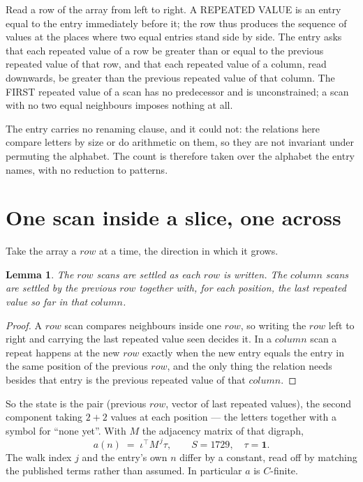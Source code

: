\documentclass[11pt,a4paper]{article}
\theoremstyle{plain}
\newtheorem{lemma}[theorem]{Lemma}
\theoremstyle{definition}
\begin{document}
Read a row of the array from left to right. A REPEATED VALUE is an entry equal to the entry
immediately before it; the row thus produces the sequence of values at the places where two
equal entries stand side by side. The entry asks that each repeated value of a row be
greater than or equal to the previous repeated value of that row, and that each repeated value of a column,
read downwards, be greater than the previous repeated value of that column. The FIRST repeated
value of a scan has no predecessor and is unconstrained; a scan with no two equal neighbours
imposes nothing at all.

The entry carries no renaming clause, and it could not: the relations here compare letters by
size or do arithmetic on them, so they are not invariant under permuting the alphabet. The
count is therefore taken over the alphabet the entry names, with no reduction to patterns.

\section{One scan inside a slice, one across}

Take the array a $row$ at a time, the direction in which it grows.

\begin{lemma}\label{lem:state}
The $row$ scans are settled as each $row$ is written. The $column$ scans are
settled by the previous $row$ together with, for each position, the last repeated value
so far in that $column$.
\end{lemma}

\begin{proof}
A $row$ scan compares neighbours inside one $row$, so writing the
$row$ left to right and carrying the last repeated value seen decides it. In a
$column$ scan a repeat happens at the new $row$ exactly when the new entry equals the
entry in the same position of the previous $row$, and the only thing the relation needs
besides that entry is the previous repeated value of that $column$.
\end{proof}

So the state is the pair (previous $row$, vector of last repeated values), the second
component taking $2+2$ values at each position --- the letters together with a symbol for
``none yet''. With $M$ the adjacency matrix of that digraph,
\[
a(n)\;=\;\iota^{\!\top}M^{\,j}\tau ,\qquad S=1729,\quad\tau=\mathbf{1} .
\]
The walk index $j$ and the entry's own $n$ differ by a constant, read off by matching the
published terms rather than assumed. In particular $a$ is $C$-finite.
\end{document}
